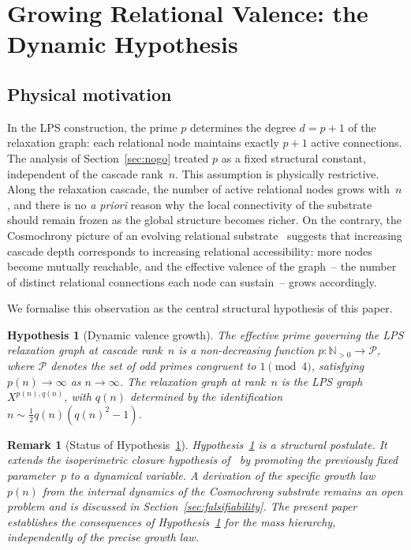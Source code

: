 \documentclass[11pt,a4paper]{article}
\newtheorem{remark}[theorem]{Remark}
\newtheorem{hypothesis}[theorem]{Hypothesis}
\begin{document}
  \section{Growing Relational Valence: the Dynamic Hypothesis}
    \label{sec:dynamic}

    \subsection{Physical motivation}
      \label{subsec:motivation}

      In the LPS construction, the prime $p$ determines the degree $d = p+1$ of the
      relaxation graph: each relational node maintains exactly $p+1$ active connections.
      The analysis of Section~\ref{sec:nogo} treated $p$ as a fixed structural constant,
      independent of the cascade rank~$n$.
      This assumption is physically restrictive.
      Along the relaxation cascade, the number of active relational nodes grows with~$n$,
      and there is no \textit{a priori} reason why the local connectivity of the
      substrate should remain frozen as the global structure becomes richer.
      On the contrary, the Cosmochrony picture of an evolving relational
      substrate~\cite{Cosmochrony} suggests that increasing cascade depth corresponds
      to increasing relational accessibility: more nodes become mutually reachable,
      and the effective valence of the graph~-- the number of distinct relational
      connections each node can sustain~-- grows accordingly.

      We formalise this observation as the central structural hypothesis of this paper.

      \begin{hypothesis}[Dynamic valence growth]
        \label{hyp:dynamic-p}
        The effective prime governing the LPS relaxation graph at cascade rank~$n$
        is a non-decreasing function $p\colon \mathbb{N}_{>0} \to \mathcal{P}$,
        where $\mathcal{P}$ denotes the set of odd primes congruent to $1\pmod{4}$,
        satisfying $p(n) \to \infty$ as $n \to \infty$.
        The relaxation graph at rank~$n$ is the LPS graph $X^{p(n),q(n)}$,
        with $q(n)$ determined by the identification $n \sim \tfrac{1}{2}q(n)(q(n)^2 - 1)$.
      \end{hypothesis}

      \begin{remark}[Status of Hypothesis~\ref{hyp:dynamic-p}]
        \label{rem:status-hyp}
        Hypothesis~\ref{hyp:dynamic-p} is a structural postulate.
        It extends the isoperimetric closure hypothesis of~\cite{Beau2026a5}
        by promoting the previously fixed parameter~$p$ to a dynamical variable.
        A derivation of the specific growth law $p(n)$ from the internal
        dynamics of the Cosmochrony substrate remains an open problem
        and is discussed in Section~\ref{sec:falsifiability}.
        The present paper establishes the consequences of
        Hypothesis~\ref{hyp:dynamic-p} for the mass hierarchy,
        independently of the precise growth law.
      \end{remark}
\end{document}
